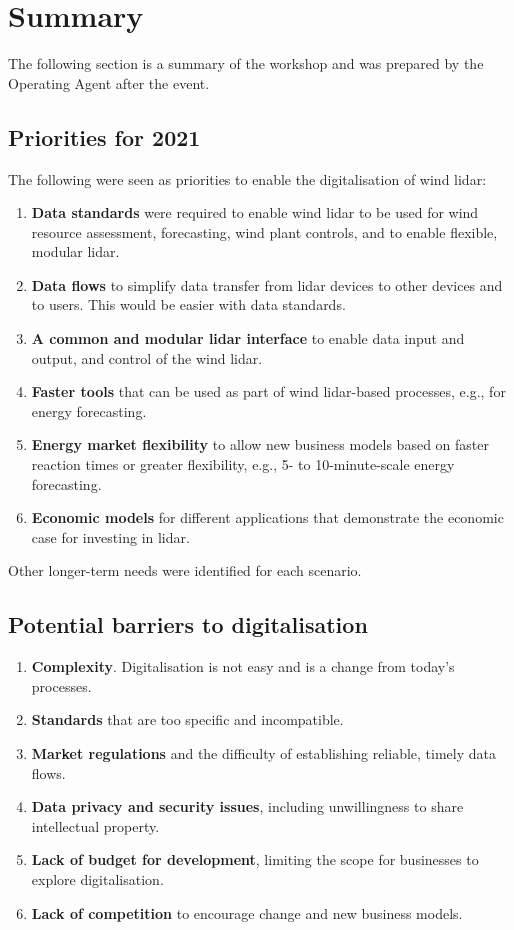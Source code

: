 \section{Summary}

The following section is a summary of the workshop and was prepared by the Operating Agent after the event.

\subsection{Priorities for 2021}

The following were seen as priorities to enable the digitalisation of wind lidar:

\begin{enumerate}
\item
  \textbf{Data standards} were required to enable wind lidar to be used for wind resource assessment, forecasting, wind plant controls, and to enable flexible, modular lidar.
\item
  \textbf{Data flows} to simplify data transfer from lidar devices to other devices and to users. This would be easier with data standards.
\item
  \textbf{A common and modular lidar interface} to enable data input and  output, and control of the wind lidar.
\item
  \textbf{Faster tools} that can be used as part of wind lidar-based   processes, e.g., for energy forecasting.
\item
  \textbf{Energy market flexibility} to allow new business models based on faster reaction times or greater flexibility, e.g., 5- to 10-minute-scale energy forecasting.
\item
  \textbf{Economic models} for different applications that demonstrate
  the economic case for investing in lidar.
\end{enumerate}

Other longer-term needs were identified for each scenario.

\subsection{Potential barriers to digitalisation}

\begin{enumerate}
\item  
  \textbf{Complexity}. Digitalisation is not easy and is a change from
  today's processes.
\item
  \textbf{Standards} that are too specific and incompatible.
\item
  \textbf{Market regulations} and the difficulty of establishing
  reliable, timely data flows.
\item
  \textbf{Data privacy and security issues}, including unwillingness to
  share intellectual property.
\item
  \textbf{Lack of budget for development}, limiting the scope for
  businesses to explore digitalisation.
\item
  \textbf{Lack of competition} to encourage change and new business
  models.
\end{enumerate}


